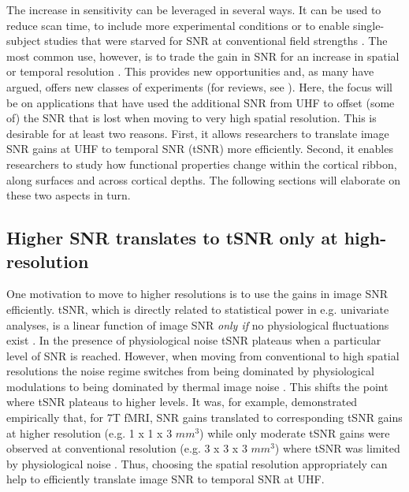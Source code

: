 The increase in sensitivity can be leveraged in several ways. It can be used to reduce scan time, to include more experimental conditions or to enable single-subject studies that were starved for SNR at conventional field strengths \parencite{Polimeni2017}. The most common use, however, is to trade the gain in SNR for an increase in spatial or temporal resolution \parencite{Polimeni2017}. This provides new opportunities and, as many have argued, offers new classes of experiments (for reviews, see \cite{Polimeni2017, DeMartino2016, Dumoulin2017}). Here, the focus will be on applications that have used the additional SNR from UHF to offset (some of) the SNR that is lost when moving to very high spatial resolution. This is desirable for at least two reasons. First, it allows researchers to translate image SNR gains at UHF to temporal SNR (tSNR) more efficiently. Second, it enables researchers to study how functional properties change within the cortical ribbon, along surfaces and across cortical depths. The following sections will elaborate on these two aspects in turn.

\subsection{Higher SNR translates to tSNR only at high-resolution}
One motivation to move to higher resolutions is to use the gains in image SNR efficiently. tSNR, which is directly related to statistical power in e.g. univariate analyses, is a linear function of image SNR \textit{only if} no physiological fluctuations exist \parencite{Murphy2007}. In the presence of physiological noise tSNR plateaus when a particular level of SNR is reached. However, when moving from conventional to high spatial resolutions the noise regime switches from being dominated by physiological modulations to being dominated by thermal image noise \parencite{Triantafyllou2005}. This shifts the point where tSNR plateaus to higher levels. It was, for example, demonstrated empirically that, for 7T fMRI, SNR gains translated to corresponding tSNR gains at higher resolution (e.g. 1 x 1 x 3 $mm^3$) while only moderate tSNR gains were observed at conventional resolution (e.g. 3 x 3 x 3 $mm^3$) where tSNR was limited by physiological noise \parencite{Triantafyllou2005}. Thus, choosing the spatial resolution appropriately can help to efficiently translate image SNR to temporal SNR at UHF.

